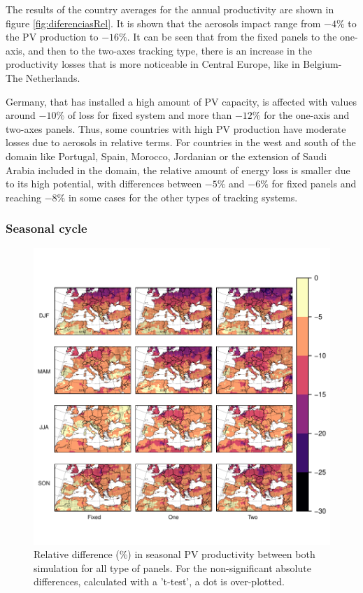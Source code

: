 The results of the country averages for the annual productivity are shown in figure \ref{fig:diferenciasRel}. It is shown that the aerosols impact range from $-4\%$ to the PV production to $-16\%$. It can be seen that from the fixed panels to the one-axis, and then to the two-axes tracking type, there is an increase in the productivity losses that is more noticeable in Central Europe, like in Belgium-The Netherlands.

Germany, that has installed a high amount of PV capacity, is affected with values around $-10\%$ of loss for fixed system and more than $-12\%$ for the one-axis and two-axes panels. Thus, some countries with high PV production have moderate losses due to aerosols in relative terms. For countries in the west and south of the domain like Portugal, Spain, Morocco, Jordanian or the extension of Saudi Arabia included in the domain, the relative amount of energy loss is smaller due to its high potential, with differences between $-5\%$ and $-6\%$ for fixed panels and reaching $-8\%$ in some cases for the other types of tracking systems.

\subsubsection{Seasonal cycle}

\begin{figure}[h!]
  \centering
  \includegraphics[width=1\textwidth]{figs/capitulo6/RelDif_aer_no_all20032009SIGt.pdf}
\caption[Differences in seasonal PV productivity between simulations with and without aerosols]{Relative difference (\%) in seasonal PV productivity between both simulation for all type of panels. For the non-significant absolute differences, calculated with a 't-test', a dot is over-plotted.}
\label{mapas}
\end{figure}

